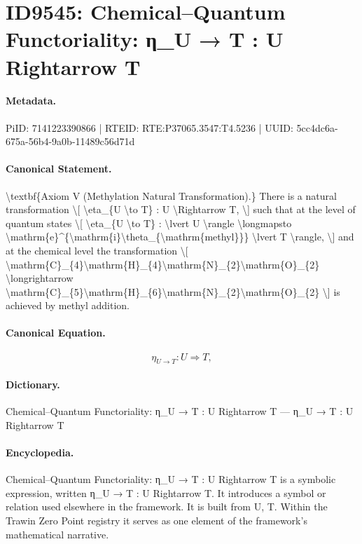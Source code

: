 \section*{ID9545: Chemical–Quantum Functoriality: η\_U → T : U Rightarrow T}
\paragraph{Metadata.}
PiID: 7141223390866 | RTEID: RTE:P37065.3547:T4.5236 | UUID: 5cc4dc6a-675a-56b4-9a0b-11489c56d71d

\paragraph{Canonical Statement.}
\textbackslash{}textbf\{Axiom V (Methylation Natural Transformation).\} There is a natural transformation \textbackslash{}[ \textbackslash{}eta\_\{U \textbackslash{}to T\} : U \textbackslash{}Rightarrow T, \textbackslash{}] such that at the level of quantum states \textbackslash{}[ \textbackslash{}eta\_\{U \textbackslash{}to T\} : \textbackslash{}lvert U \textbackslash{}rangle \textbackslash{}longmapsto \textbackslash{}mathrm\{e\}\textasciicircum{}\{\textbackslash{}mathrm\{i\}\textbackslash{}theta\_\{\textbackslash{}mathrm\{methyl\}\}\} \textbackslash{}lvert T \textbackslash{}rangle, \textbackslash{}] and at the chemical level the transformation \textbackslash{}[ \textbackslash{}mathrm\{C\}\_\{4\}\textbackslash{}mathrm\{H\}\_\{4\}\textbackslash{}mathrm\{N\}\_\{2\}\textbackslash{}mathrm\{O\}\_\{2\} \textbackslash{}longrightarrow \textbackslash{}mathrm\{C\}\_\{5\}\textbackslash{}mathrm\{H\}\_\{6\}\textbackslash{}mathrm\{N\}\_\{2\}\textbackslash{}mathrm\{O\}\_\{2\} \textbackslash{}] is achieved by methyl addition.

\paragraph{Canonical Equation.}
\[
\eta_{U \to T} : U \Rightarrow T,
\]

\paragraph{Dictionary.}
Chemical–Quantum Functoriality: η\_U → T : U Rightarrow T — η\_U → T : U Rightarrow T

\paragraph{Encyclopedia.}
Chemical–Quantum Functoriality: η\_U → T : U Rightarrow T is a symbolic expression, written η\_U → T : U Rightarrow T. It introduces a symbol or relation used elsewhere in the framework. It is built from U, T. Within the Trawin Zero Point registry it serves as one element of the framework's mathematical narrative.
